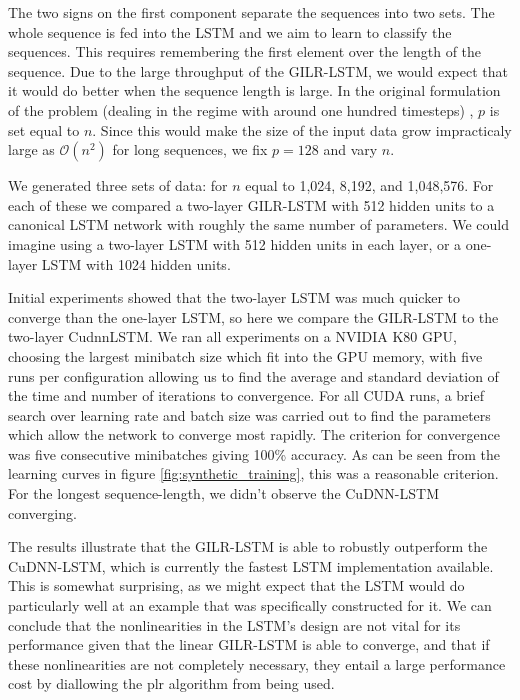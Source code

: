 \documentclass{article}
\begin{document}
The two signs on the first component separate the sequences into two sets. The
whole sequence is fed into the LSTM and we aim to learn to classify the
sequences. This requires remembering the first element over the length of the
sequence. Due to the large throughput of the GILR-LSTM, we would expect that it
would do better when the sequence length is large. In the original formulation
of the problem (dealing in the regime with around one hundred timesteps)
, \(p\) is set equal to \(n\). Since this would make the size of the input data
grow impracticaly large as \(\mathcal{O}(n^2)\) for long sequences, we fix \(p =
128\) and vary \(n\).

We generated three sets of data: for \(n\) equal to 1,024, 8,192, and
1,048,576. For each of these we compared a two-layer GILR-LSTM with 512 hidden
units to a canonical LSTM network with roughly the same number of parameters. We
could imagine using a two-layer LSTM with 512 hidden units in each layer, or a
one-layer LSTM with 1024 hidden units.

Initial experiments showed that the two-layer LSTM was much quicker to converge
than the one-layer LSTM, so here we compare the GILR-LSTM to the two-layer
CudnnLSTM.  We ran all experiments on a NVIDIA K80 GPU, choosing the largest
minibatch size which fit into the GPU memory, with five runs per configuration
allowing us to find the average and standard deviation of the time and number of
iterations to convergence. For all CUDA runs, a brief search over learning rate
and batch size was carried out to find the parameters which allow the network to
converge most rapidly. The criterion for convergence was five consecutive
minibatches giving 100\% accuracy. As can be seen from the learning curves
in figure \ref{fig:synthetic_training}, this was a reasonable criterion. For the
longest sequence-length, we didn't observe the CuDNN-LSTM converging.

The results illustrate that the GILR-LSTM is able to robustly outperform the
CuDNN-LSTM, which is currently the fastest LSTM implementation available. This
is somewhat surprising, as we might expect that the LSTM would do particularly
well at an example that was specifically constructed for it. We can conclude that
the nonlinearities in the LSTM's design are not vital for its performance given
that the linear GILR-LSTM is able to converge, and that if these nonlinearities are
not completely necessary, they entail a large performance cost by diallowing the
plr algorithm from being used.
\end{document}
